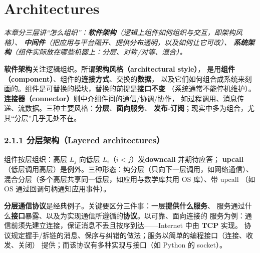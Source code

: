 \chapter{Architectures}
\begin{center}
\begin{minipage}{0.9\textwidth}
\itshape\small\color{dsgray}
本章分三层讲“怎么组织”：\textbf{软件架构}（逻辑上组件如何组织与交互，即架构风格）、
\textbf{中间件}（把应用与平台隔开、提供分布透明，以及如何让它可改）、
\textbf{系统架构}（组件实际放在哪些机器上：分层、对称/对等、混合）。
\end{minipage}
\end{center}


\textbf{软件架构}关注逻辑组织。所谓\textbf{架构风格（architectural style）}，
是用\textbf{组件（component）}、组件的\textbf{连接方式}、交换的\textbf{数据}，
以及它们如何组合成系统来刻画的。组件是可替换的模块，替换的前提是\textbf{接口不变}
（系统通常不能停机维护）。\textbf{连接器（connector）}则中介组件间的通信/协调/协作，
如过程调用、消息传递、流数据。三种主要风格：\textbf{分层}、\textbf{面向服务}、
\textbf{发布-订阅}；现实中多为组合，尤其“分层”几乎无处不在。

\subsection*{2.1.1 分层架构（Layered architectures）}
组件按层组织：高层 $L_j$ 向低层 $L_i$（$i<j$）发\textbf{downcall} 并期待应答；
\textbf{upcall}（低层调用高层）是例外。三种形态：纯分层（只向下一层调用，如网络通信）、
混合分层（多个高层共享同一低层，如应用与数学库共用 OS 库）、带 upcall
（如 OS 通过回调句柄通知应用事件）。

\begin{closeread}
\end{closeread}

\medskip\noindent\textbf{分层通信协议}是经典例子。关键要区分三件事：一层\textbf{提供什么服务}、
服务通过什么\textbf{接口}暴露、以及为实现通信所遵循的\textbf{协议}。以可靠、面向连接的
服务为例：通信前须先建立连接，保证消息不丢且按序到达——Internet 中由 \textbf{TCP} 实现。
协议规定握手/拆链的消息、保序与纠错的做法；服务以简单的编程接口（连接、收发、关闭）
提供；而该协议有多种实现与接口（如 Python 的 socket）。

